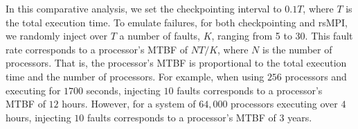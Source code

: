 

In this comparative analysis, we set the checkpointing interval to $0.1T$, where $T$ is the total execution time. To emulate failures, for both checkpointing and rsMPI, we randomly inject over $T$ a number of faults, $K$, ranging from 5 to 30. This fault rate corresponds to a processor's MTBF of $NT/K$, where $N$ is the number of processors. That is, the processor's MTBF is proportional to the total execution time and the number of processors. For example, when using $256$ processors and executing for $1700$ seconds, injecting $10$ faults corresponds to a processor's MTBF of $12$ hours. However, for a system of $64,000$ processors executing over $4$ hours, injecting $10$ faults corresponds to a processor's MTBF of $3$ years.

